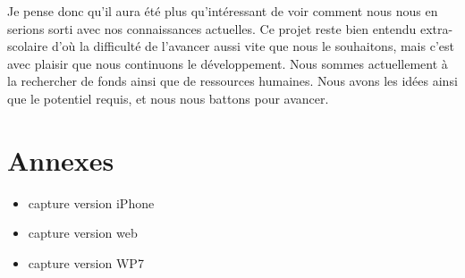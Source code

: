 \documentclass{article}
\begin{document}
		Je pense donc qu'il aura été plus qu'intéressant de voir comment nous nous en serions sorti avec nos connaissances actuelles. Ce projet reste bien entendu extra-scolaire d'où la difficulté de l'avancer aussi vite que nous le souhaitons, mais c'est avec plaisir que nous continuons le développement. Nous sommes actuellement à la rechercher de fonds ainsi que de ressources humaines. Nous avons les idées ainsi que le potentiel requis, et nous nous battons pour avancer.
	
\newpage	
\section{Annexes}
	\begin{itemize}
		\item capture version iPhone
		\item capture version web
		\item capture version WP7
	\end{itemize}
\end{document}
